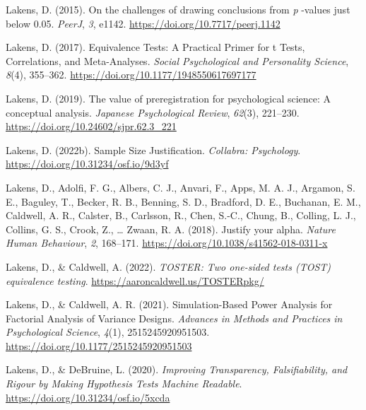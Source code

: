 \documentclass[
  oneside]{krantz}
\newlength{\cslhangindent}
\newlength{\cslentryspacingunit} %
\newenvironment{CSLReferences}[2] %
 {%
  \setlength{\parindent}{0pt}
  \ifodd #1
  \let\oldpar\par
  \def\par{\hangindent=\cslhangindent\oldpar}
  \fi
  \setlength{\parskip}{#2\cslentryspacingunit}
 }%
 {}
\begin{document}
\begin{CSLReferences}{1}{0}
\leavevmode{}%
Lakens, D. (2015). On the challenges of drawing conclusions from
{\emph{p}} -values just below 0.05. \emph{PeerJ}, \emph{3}, e1142.
\url{https://doi.org/10.7717/peerj.1142}

\leavevmode{}%
Lakens, D. (2017). Equivalence {Tests}: {A Practical Primer} for t
{Tests}, {Correlations}, and {Meta-Analyses}. \emph{Social Psychological
and Personality Science}, \emph{8}(4), 355--362.
\url{https://doi.org/10.1177/1948550617697177}

\leavevmode{}%
Lakens, D. (2019). The value of preregistration for psychological
science: {A} conceptual analysis. \emph{Japanese Psychological Review},
\emph{62}(3), 221--230. \url{https://doi.org/10.24602/sjpr.62.3_221}

\leavevmode{}%
Lakens, D. (2022b). Sample {Size Justification}. \emph{Collabra:
Psychology}. \url{https://doi.org/10.31234/osf.io/9d3yf}

\leavevmode{}%
Lakens, D., Adolfi, F. G., Albers, C. J., Anvari, F., Apps, M. A. J.,
Argamon, S. E., Baguley, T., Becker, R. B., Benning, S. D., Bradford, D.
E., Buchanan, E. M., Caldwell, A. R., Calster, B., Carlsson, R., Chen,
S.-C., Chung, B., Colling, L. J., Collins, G. S., Crook, Z., \ldots{}
Zwaan, R. A. (2018). Justify your alpha. \emph{Nature Human Behaviour},
\emph{2}, 168--171. \url{https://doi.org/10.1038/s41562-018-0311-x}

\leavevmode{}%
Lakens, D., \& Caldwell, A. (2022). \emph{TOSTER: Two one-sided tests
(TOST) equivalence testing}. \url{https://aaroncaldwell.us/TOSTERpkg/}

\leavevmode{}%
Lakens, D., \& Caldwell, A. R. (2021). Simulation-{Based Power Analysis}
for {Factorial Analysis} of {Variance Designs}. \emph{Advances in
Methods and Practices in Psychological Science}, \emph{4}(1),
2515245920951503. \url{https://doi.org/10.1177/2515245920951503}

\leavevmode{}%
Lakens, D., \& DeBruine, L. (2020). \emph{Improving {Transparency},
{Falsifiability}, and {Rigour} by {Making Hypothesis Tests Machine
Readable}}. \url{https://doi.org/10.31234/osf.io/5xcda}


\end{CSLReferences}
\end{document}

